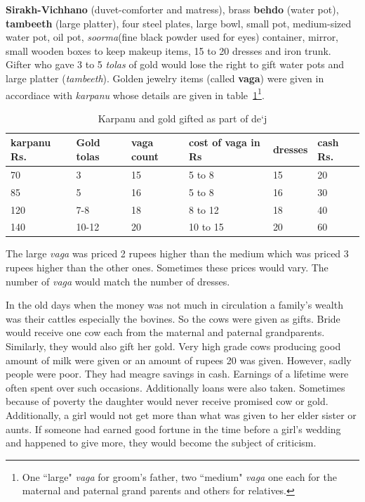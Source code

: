 \textbf{Sirakh-Vichhano} (duvet-comforter and matress), brass \textbf{behdo}
(water pot), \textbf{tambeeth} (large platter), four steel plates, large bowl,
small pot, medium-sized water pot, oil pot, \textit{soorma}(fine black
powder used for eyes) container, mirror, small wooden boxes to keep makeup
items, 15 to 20 dresses and iron trunk. Gifter who gave 3 to 5 \textit{tolas}
of gold would lose the right to gift water pots and large platter
(\textit{tambeeth}). Golden jewelry items (called \textbf{vaga}) were given in
accordiace with \textit{karpanu} whose details are given in
table~\ref{tbl:dej}\footnote{One ``large" \textit{vaga} for groom's father, two
``medium" \textit{vaga} one each for the maternal and paternal grand
parents and others for relatives.}.

\begin{table}
\begin{center}
\begin{tabular}{l|l|l|l|l|l}
\hline
\textbf{karpanu Rs.} & \textbf{Gold tolas} & \textbf{vaga count} & \textbf{cost of vaga in Rs} & \textbf{dresses} & \textbf{cash Rs.} \\
\hline
70  & 3 & 15 & 5 to 8 & 15 & 20 \\
85  & 5 & 16 & 5 to 8 & 16 & 30 \\
120 & 7-8 & 18 & 8 to 12 & 18 & 40 \\
140 & 10-12 & 20 & 10 to 15 & 20 & 60 \\
\hline
\end{tabular}
\end{center}
\caption{Karpanu and gold gifted as part of de`j}
\label{tbl:dej}
\end{table}

The large \textit{vaga} was priced 2 rupees higher than the medium which was
priced 3 rupees higher than the other ones. Sometimes these prices would vary.
The number of \textit{vaga} would match the number of dresses.

In the old days when the money was not much in circulation a family's wealth
was their cattles especially the bovines. So the cows were given as gifts.
Bride would receive one cow each from the maternal and paternal grandparents.
Similarly, they would also gift her gold. Very high grade cows producing good
amount of milk were given or an amount of rupees 20 was given. However, sadly
people were poor. They had meagre savings in cash. Earnings of a lifetime were
often spent over such occasions. Additionally loans were also taken. Sometimes
because of poverty the daughter would never receive promised cow or gold.
Additionally, a girl would not get more than what was given to her elder sister
or aunts. If someone had earned good fortune in the time before a girl's
wedding and happened to give more, they would become the subject of criticism.

